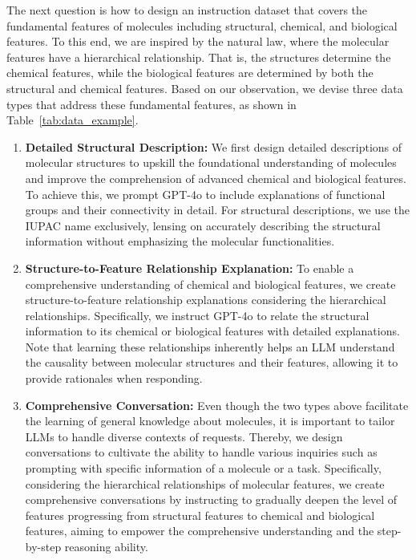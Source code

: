 The next question is how to design an instruction dataset that covers the fundamental features of molecules including structural, chemical, and biological features. To this end, we are inspired by the natural law, where the molecular features have a hierarchical relationship. That is, the structures determine the chemical features, while the biological features are determined by both the structural and chemical features. Based on our observation, we devise three data types that address these fundamental features, as shown in Table~\ref{tab:data_example}.

\vspace{-0.05in}
\begin{enumerate}[itemsep=0.5mm, parsep=3pt, leftmargin=*]
\item \textbf{Detailed Structural Description:}
We first design detailed descriptions of molecular structures to upskill the foundational understanding of molecules and improve the comprehension of advanced chemical and biological features. To achieve this, we prompt GPT-4o to include explanations of functional groups and their connectivity in detail. For structural descriptions, we use the IUPAC name exclusively, lensing on accurately describing the structural information without emphasizing the molecular functionalities.

\vspace{0.05in}
\item \textbf{Structure-to-Feature Relationship Explanation:}
To enable a comprehensive understanding of chemical and biological features, we create structure-to-feature relationship explanations considering the hierarchical relationships. Specifically, we instruct GPT-4o to relate the structural information to its chemical or biological features with detailed explanations. Note that learning these relationships inherently helps an LLM understand the causality between molecular structures and their features, allowing it to provide rationales when responding.

\vspace{0.05in}
\item \textbf{Comprehensive Conversation:}
Even though the two types above facilitate the learning of general knowledge about molecules, it is important to tailor LLMs to handle diverse contexts of requests. Thereby, we design conversations to cultivate the ability to handle various inquiries such as prompting with specific information of a molecule or a task. Specifically, considering the hierarchical relationships of molecular features, we create comprehensive conversations by instructing to gradually deepen the level of features progressing from structural features to chemical and biological features, aiming to empower the comprehensive understanding and the step-by-step reasoning ability.
\end{enumerate}

